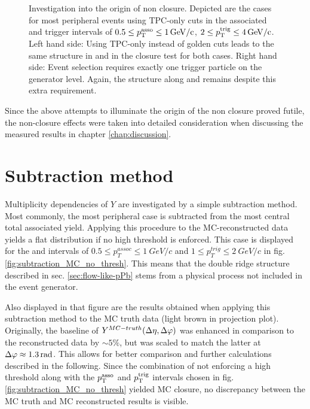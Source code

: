\begin{figure}[htbp]
  \caption[Investigation into the origin of non closure by changing changing event selection criterion and track cuts.]{Investigation into the origin of non closure. Depicted are the cases for most peripheral events using TPC-only cuts in the associated and trigger intervals of $0.5 \le p_{\text{T}}^{\text{asso}} \le \SI{1}{GeV/c}$, $2 \le p_{\text{T}}^{\text{trig}} \le \SI{4}{GeV/c}$. Left hand side: Using \gls{TPC-only} instead of \gls{golden} cuts leads to the same structure in \deta and \dphi in the closure test for both cases. Right hand side: Event selection requires exactly one trigger particle on the generator level. Again, the structure along \deta and \dphi remains despite this extra requirement.}
  \label{fig:investigate_non_closure}
\end{figure}

Since the above attempts to illuminate the origin of the non closure proved futile, the non-closure effects were taken into detailed consideration when discussing the measured results in chapter \ref{chap:discussion}.

\section{Subtraction method}
\label{sec:subtraction}
Multiplicity dependencies of $Y$ are investigated by a simple subtraction method. Most commonly, the most peripheral case is subtracted from the most central total associated yield. Applying this procedure to the MC-reconstructed data yields a flat distribution if no high \pt threshold is enforced. This case is displayed for the \ptassoc and \pttrig intervals of $0.5 \le p_T^{assoc} \le \SI{1}{GeV/c}$ and $1 \le p_T^{trig} \le \SI{2}{GeV/c}$ in fig. \ref{fig:subtraction_MC_no_thresh}.  This means that the double ridge structure described in sec. \ref{sec:flow-like-pPb} stems from a physical process not included in the event generator.

Also displayed in that figure are the results obtained when applying this subtraction method to the MC truth data (light brown in \dphi projection plot). Originally, the baseline of $Y^{MC-truth}(\Delta\eta, \Delta\varphi)$ was enhanced in comparison to the reconstructed data by $\sim5\%$, but was scaled to match the latter at $\Delta\varphi \approx \SI{1.3}{rad}$. This allows for better comparison and further calculations described in the following. Since the combination of not enforcing a high \pt threshold along with the  $p_{\text{T}}^{\text{asso}}$ and $p_{\text{T}}^{\text{trig}}$ intervals chosen in fig. \ref{fig:subtraction_MC_no_thresh} yielded MC closure, no discrepancy between the MC truth and MC reconstructed results is visible.



